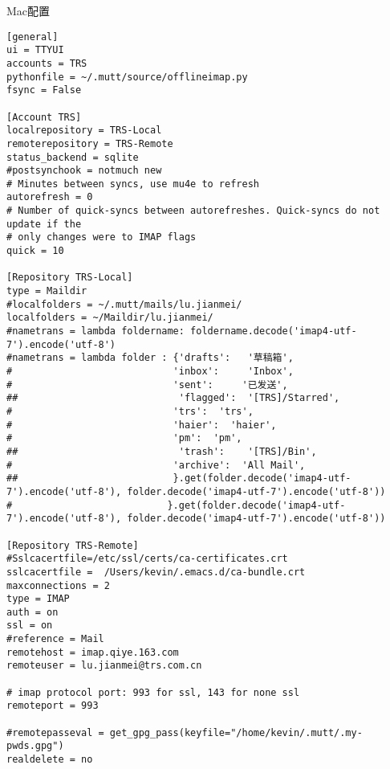 \documentclass[10pt,a4paper]{article}
\begin{document}
\begin{enumerate}
Mac配置
\begin{lstlisting}
[general]
ui = TTYUI
accounts = TRS
pythonfile = ~/.mutt/source/offlineimap.py
fsync = False

[Account TRS]
localrepository = TRS-Local
remoterepository = TRS-Remote
status_backend = sqlite
#postsynchook = notmuch new
# Minutes between syncs, use mu4e to refresh
autorefresh = 0
# Number of quick-syncs between autorefreshes. Quick-syncs do not update if the
# only changes were to IMAP flags
quick = 10

[Repository TRS-Local]
type = Maildir
#localfolders = ~/.mutt/mails/lu.jianmei/
localfolders = ~/Maildir/lu.jianmei/
#nametrans = lambda foldername: foldername.decode('imap4-utf-7').encode('utf-8')
#nametrans = lambda folder : {'drafts':   '草稿箱',
#                            'inbox':     'Inbox',
#                            'sent':     '已发送',
##                            'flagged':  '[TRS]/Starred',
#                            'trs':  'trs',
#                            'haier':  'haier',
#                            'pm':  'pm',
##                            'trash':    '[TRS]/Bin',
#                            'archive':  'All Mail',
##                           }.get(folder.decode('imap4-utf-7').encode('utf-8'), folder.decode('imap4-utf-7').encode('utf-8'))
#                           }.get(folder.decode('imap4-utf-7').encode('utf-8'), folder.decode('imap4-utf-7').encode('utf-8'))

[Repository TRS-Remote]
#Sslcacertfile=/etc/ssl/certs/ca-certificates.crt
sslcacertfile =  /Users/kevin/.emacs.d/ca-bundle.crt
maxconnections = 2
type = IMAP
auth = on
ssl = on
#reference = Mail
remotehost = imap.qiye.163.com
remoteuser = lu.jianmei@trs.com.cn

# imap protocol port: 993 for ssl, 143 for none ssl
remoteport = 993

#remotepasseval = get_gpg_pass(keyfile="/home/kevin/.mutt/.my-pwds.gpg")
realdelete = no



\end{lstlisting}
\end{enumerate}
\end{document}
